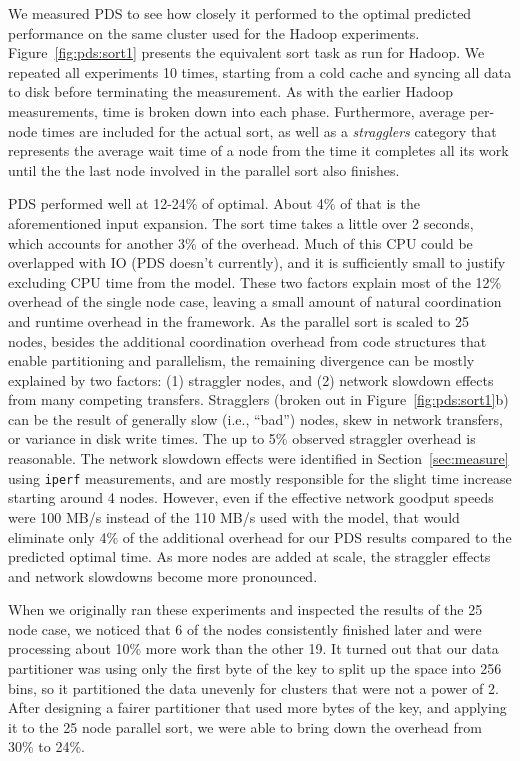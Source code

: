 We measured PDS to see how closely it performed to the optimal
predicted performance on the same cluster used for the Hadoop
experiments.  Figure~\ref{fig:pds:sort1} presents the equivalent sort task
as run for Hadoop.  We repeated all experiments 10 times, starting
from a cold cache and syncing all data to disk before terminating the
measurement.
As with the earlier Hadoop measurements, time is
broken down into each phase.  Furthermore, average per-node times are
included for the actual sort, as well as a \emph{stragglers} category
that represents the average wait time of a node from the time it
completes all its work until the the last node involved in the
parallel sort also finishes.

PDS performed well at 12-24\% of optimal.  About 4\% of that is the
aforementioned input expansion.  The sort time takes a little over 2
seconds, which accounts for another 3\% of the overhead.  Much of this
CPU could be overlapped with IO (PDS doesn't currently), and it is
sufficiently small to justify excluding CPU time from the model.
These two factors explain most of the 12\% overhead of the single node
case, leaving a small amount of natural coordination and runtime
overhead in the framework.  As the parallel sort is scaled to 25
nodes, besides the additional coordination overhead from code
structures that enable partitioning and parallelism, the remaining
divergence can be mostly explained by two factors: (1) straggler
nodes, and (2) network slowdown effects from many competing transfers.
Stragglers (broken out in Figure~\ref{fig:pds:sort1}b) can be the
result of generally slow (i.e., ``bad'') nodes, skew in network
transfers, or variance in disk write times.  The up to 5\% observed
straggler overhead is reasonable.  The network slowdown effects were
identified in Section~\ref{sec:measure} using \texttt{iperf}
measurements, and are mostly responsible for the slight time increase
starting around 4 nodes.  However, even if the effective network
goodput speeds were 100 MB/s instead of the 110 MB/s used with the
model, that would eliminate only 4\% of the additional overhead for
our PDS results compared to the predicted optimal time.  As more nodes
are added at scale, the straggler effects and network slowdowns become
more pronounced.



When we originally ran these experiments and inspected the results of
the 25 node case, we noticed that 6 of the nodes consistently finished
later and were processing about 10\% more work than the other 19.  It
turned out that our data partitioner was using only the first byte of
the key to split up the space into 256 bins, so it partitioned the
data unevenly for clusters that were not a power of 2.  After
designing a fairer partitioner that used more bytes of the key, and
applying it to the 25 node parallel sort, we were able to bring down
the overhead from 30\% to 24\%.

